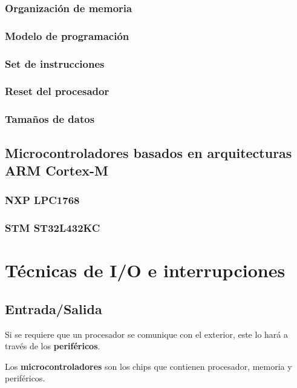\documentclass[a4paper]{book}
\begin{document}
\subsection{Organización de memoria}

\subsection{Modelo de programación}

\subsection{Set de instrucciones}

\subsection{Reset del procesador}

\subsection{Tamaños de datos}

\section{Microcontroladores basados en arquitecturas ARM Cortex-M}

\subsection{NXP LPC1768}

\subsection{STM ST32L432KC}

\chapter{Técnicas de I/O e interrupciones}

\section{Entrada/Salida}

Si se requiere que un procesador se comunique con el exterior, este lo hará a través de los \textbf{periféricos}. 

Los \textbf{microcontroladores} son los chips que contienen procesador, memoria y periféricos.
\end{document}
